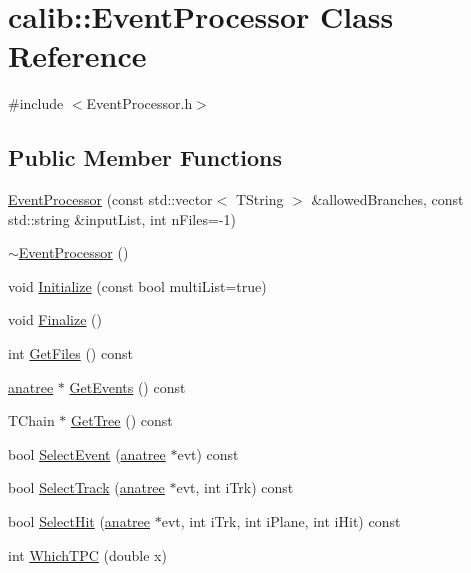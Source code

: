 \hypertarget{classcalib_1_1EventProcessor}{\section{calib\-:\-:Event\-Processor Class Reference}
\label{classcalib_1_1EventProcessor}
}


{\ttfamily \#include $<$Event\-Processor.\-h$>$}

\subsection*{Public Member Functions}
\begin{DoxyCompactItemize}
\item 
\hyperlink{classcalib_1_1EventProcessor_a98752ed4b110e0bc602bc9cf90671abe}{Event\-Processor} (const std\-::vector$<$ T\-String $>$ \&allowed\-Branches, const std\-::string \&input\-List, int n\-Files=-\/1)
\item 
\hyperlink{classcalib_1_1EventProcessor_a94c04ba9befa3dafe797dd985b7fab3d}{$\sim$\-Event\-Processor} ()
\item 
void \hyperlink{classcalib_1_1EventProcessor_abf70002d5305768445ccb726b569b62d}{Initialize} (const bool multi\-List=true)
\item 
void \hyperlink{classcalib_1_1EventProcessor_a15c2dd37ce2fa3ad037b08d1fce64de8}{Finalize} ()
\item 
int \hyperlink{classcalib_1_1EventProcessor_a23237a4b66c1c16ff31daa9a035700ae}{Get\-Files} () const 
\item 
\hyperlink{classanatree}{anatree} $\ast$ \hyperlink{classcalib_1_1EventProcessor_ab2676a33c42efae39b0ced9c418f9c2e}{Get\-Events} () const 
\item 
T\-Chain $\ast$ \hyperlink{classcalib_1_1EventProcessor_a5f40e3cf46beb88dd66322dd3a49fe61}{Get\-Tree} () const 
\item 
bool \hyperlink{classcalib_1_1EventProcessor_a9a905d11dcfe30aa417921d38f74bb55}{Select\-Event} (\hyperlink{classanatree}{anatree} $\ast$evt) const 
\item 
bool \hyperlink{classcalib_1_1EventProcessor_ab7475e3c9e6a0fefece6f02deec92bd1}{Select\-Track} (\hyperlink{classanatree}{anatree} $\ast$evt, int i\-Trk) const 
\item 
bool \hyperlink{classcalib_1_1EventProcessor_a84eefb48808eb6fe79337213e020984a}{Select\-Hit} (\hyperlink{classanatree}{anatree} $\ast$evt, int i\-Trk, int i\-Plane, int i\-Hit) const 
\item 
int \hyperlink{classcalib_1_1EventProcessor_a41ad171510ce6ebce5c2781fb3b46961}{Which\-T\-P\-C} (double x)
\end{DoxyCompactItemize}

